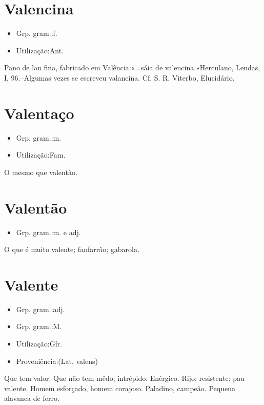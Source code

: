 \documentclass{article}
\begin{document}
\section{Valencina}
\begin{itemize}
\item {Grp. gram.:f.}
\end{itemize}
\begin{itemize}
\item {Utilização:Ant.}
\end{itemize}
Pano de lan fina, fabricado em Valência:«\textunderscore ...sáia de valencina.\textunderscore »Herculano, \textunderscore Lendas\textunderscore , I, 96.--Algumas vezes se escreveu \textunderscore valancina\textunderscore . Cf. S. R. Viterbo, \textunderscore Elucidário\textunderscore .
\section{Valentaço}
\begin{itemize}
\item {Grp. gram.:m.}
\end{itemize}
\begin{itemize}
\item {Utilização:Fam.}
\end{itemize}
O mesmo que \textunderscore valentão\textunderscore .
\section{Valentão}
\begin{itemize}
\item {Grp. gram.:m.  e  adj.}
\end{itemize}
O que é muito valente; fanfarrão; gabarola.
\section{Valente}
\begin{itemize}
\item {Grp. gram.:adj.}
\end{itemize}
\begin{itemize}
\item {Grp. gram.:M.}
\end{itemize}
\begin{itemize}
\item {Utilização:Gír.}
\end{itemize}
\begin{itemize}
\item {Proveniência:(Lat. \textunderscore valens\textunderscore )}
\end{itemize}
Que tem valor.
Que não tem mêdo; intrépido.
Enérgico.
Rijo; resistente: \textunderscore pau valente\textunderscore .
Homem esforçado, homem corajoso.
Paladino, campeão.
Pequena alavanca de ferro.
\end{document}
